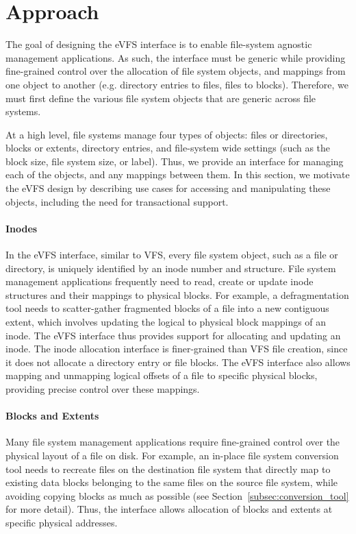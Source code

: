 \vspace{-0.5em}
\section{Approach\label{sec:Approach}}

The goal of designing the eVFS interface is to enable file-system agnostic management applications. As such, the interface must be generic while providing fine-grained control over the allocation of file system objects, and mappings from one object to another (e.g. directory entries to files, files to blocks). Therefore, we must first define the various file system objects that are generic across file systems.

At a high level, file systems manage four types of objects: files or directories, blocks or extents, directory entries, and file-system wide settings (such as the block size, file system size, or label). Thus, we provide an interface for managing each of the objects, and any mappings between them. In this section, we motivate the eVFS design by describing use cases for accessing and manipulating these objects, including the need for transactional support.

\paragraph{Inodes} In the eVFS interface, similar to VFS, every file system object, such as a file or directory, is uniquely identified by an inode number and structure. File system management applications frequently need to read, create or update inode structures and their mappings to physical blocks.
For example, a defragmentation tool needs to scatter-gather fragmented blocks of a file into a new contiguous extent, which involves updating the logical to physical block mappings of an inode. The eVFS interface thus provides support for allocating and updating an inode. The inode allocation interface is finer-grained than VFS file creation, since it does not allocate a directory entry or file blocks. The eVFS interface also allows mapping and unmapping logical offsets of a file to specific physical blocks, providing precise control over these mappings.

\paragraph{Blocks and Extents} Many file system management applications require fine-grained control over the physical layout of a file on disk. For example, an in-place file system conversion tool needs to recreate files on the destination file system that directly map to existing data blocks belonging to the same files on the source file system, while avoiding copying blocks as much as possible (see Section~\ref{subsec:conversion_tool} for more detail). Thus, the interface allows allocation of blocks and extents at specific physical addresses.

